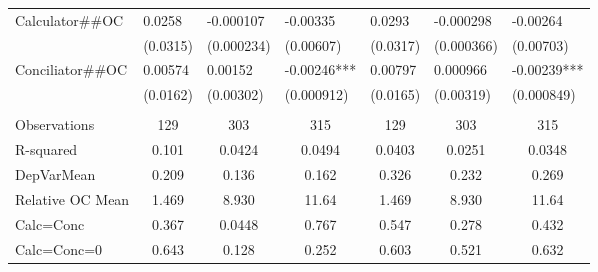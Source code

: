 \begin{tabular}{rrrrrrr}
\multicolumn{1}{l}{Calculator\#\#OC} & \multicolumn{1}{l}{0.0258} & \multicolumn{1}{l}{-0.000107} & \multicolumn{1}{l}{-0.00335} & \multicolumn{1}{l}{0.0293} & \multicolumn{1}{l}{-0.000298} & \multicolumn{1}{l}{-0.00264} \\
\multicolumn{1}{l}{} & \multicolumn{1}{l}{(0.0315)} & \multicolumn{1}{l}{(0.000234)} & \multicolumn{1}{l}{(0.00607)} & \multicolumn{1}{l}{(0.0317)} & \multicolumn{1}{l}{(0.000366)} & \multicolumn{1}{l}{(0.00703)} \\
\multicolumn{1}{l}{Conciliator\#\#OC} & \multicolumn{1}{l}{0.00574} & \multicolumn{1}{l}{0.00152} & \multicolumn{1}{l}{-0.00246***} & \multicolumn{1}{l}{0.00797} & \multicolumn{1}{l}{0.000966} & \multicolumn{1}{l}{-0.00239***} \\
\multicolumn{1}{l}{} & \multicolumn{1}{l}{(0.0162)} & \multicolumn{1}{l}{(0.00302)} & \multicolumn{1}{l}{(0.000912)} & \multicolumn{1}{l}{(0.0165)} & \multicolumn{1}{l}{(0.00319)} & \multicolumn{1}{l}{(0.000849)} \\
\multicolumn{1}{l}{} & \multicolumn{1}{l}{} & \multicolumn{1}{l}{} & \multicolumn{1}{l}{} & \multicolumn{1}{l}{} & \multicolumn{1}{l}{} & \multicolumn{1}{l}{} \\
\midrule
\multicolumn{1}{l}{Observations} & \multicolumn{1}{c}{129} & \multicolumn{1}{c}{303} & \multicolumn{1}{c}{315} & \multicolumn{1}{c}{129} & \multicolumn{1}{c}{303} & \multicolumn{1}{c}{315} \\
\multicolumn{1}{l}{R-squared} & \multicolumn{1}{c}{0.101} & \multicolumn{1}{c}{0.0424} & \multicolumn{1}{c}{0.0494} & \multicolumn{1}{c}{0.0403} & \multicolumn{1}{c}{0.0251} & \multicolumn{1}{c}{0.0348} \\
\multicolumn{1}{l}{DepVarMean} & \multicolumn{1}{c}{0.209} & \multicolumn{1}{c}{0.136} & \multicolumn{1}{c}{0.162} & \multicolumn{1}{c}{0.326} & \multicolumn{1}{c}{0.232} & \multicolumn{1}{c}{0.269} \\
\multicolumn{1}{l}{Relative OC Mean} & \multicolumn{1}{c}{1.469} & \multicolumn{1}{c}{8.930} & \multicolumn{1}{c}{11.64} & \multicolumn{1}{c}{1.469} & \multicolumn{1}{c}{8.930} & \multicolumn{1}{c}{11.64} \\
\multicolumn{1}{l}{Calc=Conc} & \multicolumn{1}{c}{0.367} & \multicolumn{1}{c}{0.0448} & \multicolumn{1}{c}{0.767} & \multicolumn{1}{c}{0.547} & \multicolumn{1}{c}{0.278} & \multicolumn{1}{c}{0.432} \\
\multicolumn{1}{l}{Calc=Conc=0} & \multicolumn{1}{c}{0.643} & \multicolumn{1}{c}{0.128} & \multicolumn{1}{c}{0.252} & \multicolumn{1}{c}{0.603} & \multicolumn{1}{c}{0.521} & \multicolumn{1}{c}{0.632} \\
\bottomrule
\bottomrule
\end{tabular}%
